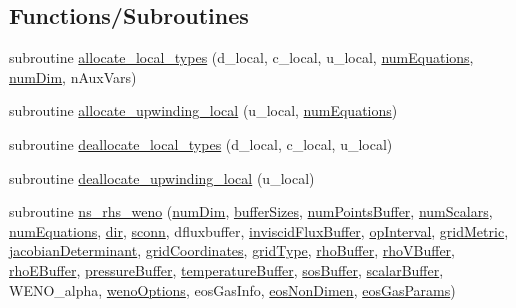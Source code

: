 \subsection*{Functions/\+Subroutines}
\begin{DoxyCompactItemize}
\item 
subroutine \hyperlink{namespacenavierstokesrhsweno_a0e801cde0142e2c2046191a109d64601}{allocate\+\_\+local\+\_\+types} (d\+\_\+local, c\+\_\+local, u\+\_\+local, \hyperlink{WENOKernels_8H_a118b6c5063941671714ad42ce6ccf62e}{num\+Equations}, \hyperlink{SATKernels_8H_a680185db8546de161968dabace9e94f1}{num\+Dim}, n\+Aux\+Vars)
\item 
subroutine \hyperlink{namespacenavierstokesrhsweno_abe3d17704e23fdee041cbc4a7c58d78b}{allocate\+\_\+upwinding\+\_\+local} (u\+\_\+local, \hyperlink{WENOKernels_8H_a118b6c5063941671714ad42ce6ccf62e}{num\+Equations})
\item 
subroutine \hyperlink{namespacenavierstokesrhsweno_a097089e1d0c132ad64a8c601319499bb}{deallocate\+\_\+local\+\_\+types} (d\+\_\+local, c\+\_\+local, u\+\_\+local)
\item 
subroutine \hyperlink{namespacenavierstokesrhsweno_af0672aeaf819970b43963e86448c91ad}{deallocate\+\_\+upwinding\+\_\+local} (u\+\_\+local)
\item 
subroutine \hyperlink{namespacenavierstokesrhsweno_a1df7b6e3020cca9787110b8f1f5a024f}{ns\+\_\+rhs\+\_\+weno} (\hyperlink{SATKernels_8H_a680185db8546de161968dabace9e94f1}{num\+Dim}, \hyperlink{WENOKernels_8H_a302023d425dc22c2c647b4f9d8c78b0b}{buffer\+Sizes}, \hyperlink{WENOKernels_8H_a86c25ff33e6d9bccfabdf45dc5ddf24c}{num\+Points\+Buffer}, \hyperlink{WENOKernels_8H_a653618c9ce0046e8ef3b30321ea41f98}{num\+Scalars}, \hyperlink{WENOKernels_8H_a118b6c5063941671714ad42ce6ccf62e}{num\+Equations}, \hyperlink{WENOKernels_8H_ac055ecf2f0c28b4f3676d05314d9840c}{dir}, \hyperlink{WENOKernels_8H_a84323f7f31a8db8ca9cb6ffd45f53a8a}{sconn}, dfluxbuffer, \hyperlink{WENOKernels_8H_a263d06ceac785fb9ccc396be5508a5d6}{inviscid\+Flux\+Buffer}, \hyperlink{WENOKernels_8H_a23d86f4608a92738225f87574392b273}{op\+Interval}, \hyperlink{WENOKernels_8H_a901f07fa4e3f966a2f6951d6c5974e89}{grid\+Metric}, \hyperlink{WENOKernels_8H_a683cd3089fd3d704d36a88a01154d7a7}{jacobian\+Determinant}, \hyperlink{WENOKernels_8H_a55f433dcd5ee1a2b6a9d73ce18fcaa58}{grid\+Coordinates}, \hyperlink{WENOKernels_8H_ab35a6cf312bb0fddda7097a149c3e946}{grid\+Type}, \hyperlink{WENOKernels_8H_a7f8551332dfedc9c12724ab3903db88c}{rho\+Buffer}, \hyperlink{WENOKernels_8H_aaddaafee4b407fa52d0756171ec50a51}{rho\+V\+Buffer}, \hyperlink{WENOKernels_8H_a355f99edd58be395aedbe083ffca12b0}{rho\+E\+Buffer}, \hyperlink{WENOKernels_8H_ad7fb6f5370938321db995446ba47c04b}{pressure\+Buffer}, \hyperlink{WENOKernels_8H_a81c39e1ec75a82e2a4ece4c61c356f36}{temperature\+Buffer}, \hyperlink{WENOKernels_8H_ad2e7242a5875e6d926fcdf5e83d45e41}{sos\+Buffer}, \hyperlink{WENOKernels_8H_ae53b6c0ad2686009b00d987ad35f4810}{scalar\+Buffer}, W\+E\+N\+O\+\_\+alpha, \hyperlink{WENOKernels_8H_ab0a9a4f63f5ec810f436c1071ccb6eea}{weno\+Options}, eos\+Gas\+Info, \hyperlink{WENOKernels_8H_ab086e80006b932eb5dadc76f88126367}{eos\+Non\+Dimen}, \hyperlink{WENOKernels_8H_ae3d0a391e4050ddaf66a42b2596fa3cd}{eos\+Gas\+Params})

\end{DoxyCompactItemize}
